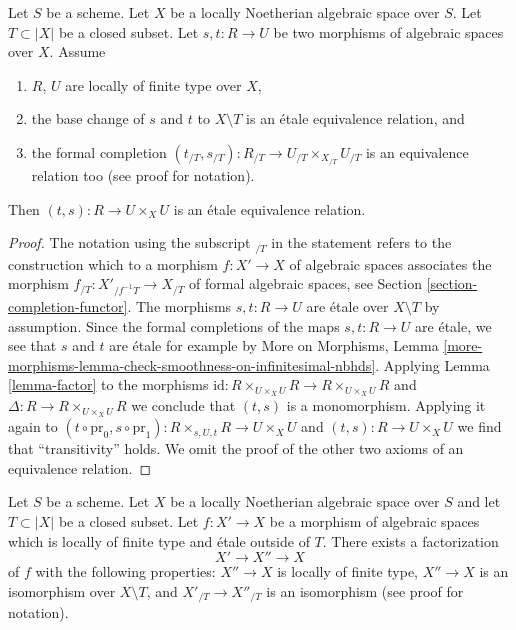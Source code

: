 \begin{lemma}
\label{lemma-equivalence-relation}
Let $S$ be a scheme. Let $X$ be a locally Noetherian algebraic space
over $S$. Let $T \subset |X|$ be a closed subset.
Let $s, t : R \to U$ be two morphisms of algebraic spaces over $X$.
Assume
\begin{enumerate}
\item $R$, $U$ are locally of finite type over $X$,
\item the base change of $s$ and $t$ to $X \setminus T$
is an \'etale equivalence relation, and
\item the formal completion
$(t_{/T}, s_{/T}) : R_{/T} \to U_{/T} \times_{X_{/T}} U_{/T}$
is an equivalence relation too (see proof for notation).
\end{enumerate}
Then $(t, s) : R \to U \times_X U$ is an \'etale equivalence relation.
\end{lemma}

\begin{proof}
The notation using the subscript ${}_{/T}$ in the statement refers to the
construction which to a morphism $f : X' \to X$ of algebraic spaces
associates the morphism $f_{/T} : X'_{/f^{-1}T} \to X_{/T}$ of formal
algebraic spaces, see Section \ref{section-completion-functor}.
The morphisms $s, t : R \to U$ are \'etale over $X \setminus T$
by assumption. Since the formal completions of the maps
$s, t : R \to U$ are \'etale, we see that $s$ and $t$ are \'etale
for example by More on Morphisms, Lemma
\ref{more-morphisms-lemma-check-smoothness-on-infinitesimal-nbhds}.
Applying Lemma \ref{lemma-factor} to the morphisms
$\text{id} : R \times_{U \times_X U} R \to R \times_{U \times_X U} R$
and $\Delta : R \to R \times_{U \times_X U} R$ we conclude that
$(t, s)$ is a monomorphism. Applying it again to
$(t \circ \text{pr}_0, s \circ \text{pr}_1) :
R \times_{s, U, t} R \to U \times_X U$ and $(t, s) : R \to U \times_X U$
we find that ``transitivity'' holds. We omit the proof of
the other two axioms of an equivalence relation.
\end{proof}

\begin{lemma}
\label{lemma-smash-away-from-T}
Let $S$ be a scheme. Let $X$ be a locally Noetherian algebraic space over $S$
and let $T \subset |X|$ be a closed subset. Let $f : X' \to X$ be a morphism
of algebraic spaces which is locally of finite type and \'etale outside of $T$.
There exists a factorization
$$
X' \longrightarrow X'' \longrightarrow X
$$
of $f$ with the following properties:
$X'' \to X$ is locally of finite type,
$X'' \to X$ is an isomorphism over $X \setminus T$, and
$X'_{/T} \to X''_{/T}$ is an isomorphism (see proof for notation).
\end{lemma}

